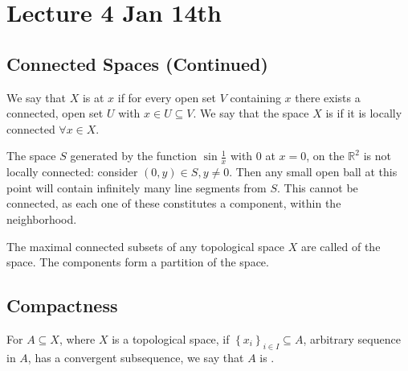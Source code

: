 \documentclass[notoc,notitlepage]{tufte-book}
\begin{document}


\chapter{Lecture 4 Jan 14th}%
\label{chp:lecture_4_jan_14th}

\section{Connected Spaces (Continued)}%
\label{sec:connected_spaces_continued}

\begin{defn}\label{defn:locally_connected}
  We say that $X$ is  at $x$ if for every open set $V$
  containing $x$ there exists a connected, open set $U$ with $x \in U \subseteq V$. We say that
  the space $X$ is  if it is locally connected $\forall x \in X$.
\end{defn}

\begin{eg}
  The space $S$ generated by the function $\sin \frac{1}{x}$ with $0$ at $x = 0$,
  on the $\mathbb{R}^2$ is not locally connected: consider $(0, y) \in S, y \neq 0$.
  Then any small open ball at this point will contain infinitely many line segments from $S$.
  This cannot be connected, as each one of these constitutes a component,
  within the neighborhood.
\end{eg}

\begin{defn}\label{defn:connected_component}
  The maximal connected subsets of any topological space $X$ are called
   of the space. The components form a partition
  of the space.
\end{defn}


\section{Compactness}%
\label{sec:compactness}

\begin{defn}\label{defn:sequential_compactness}
  For $A \subseteq X$, where $X$ is a topological space, if
  $\left\{ x_i \right\}_{i \in I} \subseteq A$, arbitrary sequence in $A$, has a
  convergent subsequence, we say that $A$ is .
\end{defn}
\end{document}

